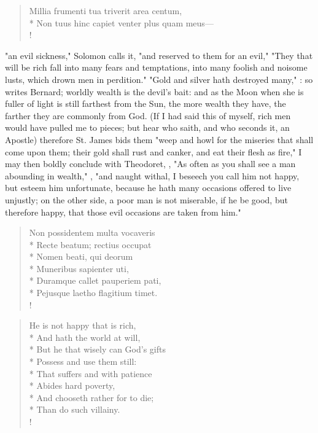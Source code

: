{
\begin{latin}
\begin{verse}
Millia frumenti tua triverit area centum,\\*
Non tuus hinc capiet venter plus quam meus---\\!
\end{verse}
\end{latin}

"an evil sickness," Solomon calls it, "and reserved to them for an evil,"  "They that will be rich fall into many fears and temptations, into many foolish and noisome lusts, which drown men in perdition."  "Gold and silver hath destroyed many,"  : so writes Bernard; worldly wealth is the devil's bait: and as the Moon when she is fuller of light is still farthest from the Sun, the more wealth they have, the farther they are commonly from God. (If I had said this of myself, rich men would have pulled me to pieces; but hear who saith, and who seconds it, an Apostle) therefore St. James bids them "weep and howl for the miseries that shall come upon them; their gold shall rust and canker, and eat their flesh as fire,"  I may then boldly conclude with Theodoret, , \etc{} "As often as you shall see a man abounding in wealth," , "and naught withal, I beseech you call him not happy, but esteem him unfortunate, because he hath many occasions offered to live unjustly; on the other side, a poor man is not miserable, if he be good, but therefore happy, that those evil occasions are taken from him."

\begin{latin}
\begin{verse}%
Non possidentem multa vocaveris\\*
Recte beatum; rectius occupat\\*
Nomen beati, qui deorum\\*
Muneribus sapienter uti,\\*
Duramque callet pauperiem pati,\\*
Pejusque laetho flagitium timet.\\!
\end{verse}%
\end{latin}
\translationrule%
\begin{verse}%
He is not happy that is rich,\\*
And hath the world at will,\\*
But he that wisely can God's gifts\\*
Possess and use them still:\\*
That suffers and with patience\\*
Abides hard poverty,\\*
And chooseth rather for to die;\\*
Than do such villainy.\\!
\end{verse}%
%

}
